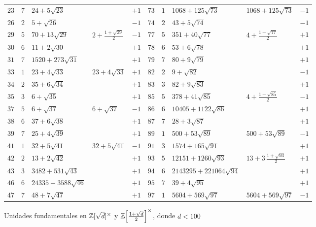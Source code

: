 \begin{figure}
\begin{center}
\begin{tabular}{M{0.3cm}M{0.4cm}M{2.5cm}M{2.1cm}M{0.7cm}|M{0.3cm}M{0.4cm}M{3.3cm}M{2.4cm}M{0.7cm}}
      $23$ & $7$ & $24 + 5\sqrt{23}$ & & $+1$ & $73$ & $1$ & $1068 + 125\sqrt{73}$ & $1068 + 125\sqrt{73}$ & $-1$ \\
      $26$ & $2$ & $5 + \sqrt{26}$ & & $-1$ & $74$ & $2$ & $43 + 5\sqrt{74}$ & & $-1$ \\
      $29$ & $5$ & $70 + 13\sqrt{29}$ & $2 + \frac{1+\sqrt{29}}{2}$ & $-1$ & $77$ & $5$ & $351 + 40\sqrt{77}$ & $4 + \frac{1+\sqrt{77}}{2}$ & $+1$ \\
      $30$ & $6$ & $11 + 2\sqrt{30}$ & & $+1$ & $78$ & $6$ & $53 + 6\sqrt{78}$ & & $+1$ \\
      $31$ & $7$ & $1520 + 273\sqrt{31}$ & & $+1$ & $79$ & $7$ & $80 + 9\sqrt{79}$ & & $+1$ \\
      $33$ & $1$ & $23 + 4\sqrt{33}$ & $23 + 4\sqrt{33}$ & $+1$ & $82$ & $2$ & $9 + \sqrt{82}$ & & $-1$ \\
      $34$ & $2$ & $35 + 6\sqrt{34}$ & & $+1$ & $83$ & $3$ & $82 + 9\sqrt{83}$ & & $+1$ \\
      $35$ & $3$ & $6 + \sqrt{35}$ & & $+1$ & $85$ & $5$ & $378 + 41\sqrt{85}$ & $4 + \frac{1+\sqrt{85}}{2}$ & $-1$ \\
      $37$ & $5$ & $6 + \sqrt{37}$ & $6 + \sqrt{37}$ & $-1$ & $86$ & $6$ & $10405 + 1122\sqrt{86}$ & & $+1$ \\
      $38$ & $6$ & $37 + 6\sqrt{38}$ & & $+1$ & $87$ & $7$ & $28 + 3\sqrt{87}$ & & $+1$ \\
      $39$ & $7$ & $25 + 4\sqrt{39}$ & & $+1$ & $89$ & $1$ & $500 + 53\sqrt{89}$ & $500 + 53\sqrt{89}$ & $-1$ \\
      $41$ & $1$ & $32 + 5\sqrt{41}$ & $32 + 5\sqrt{41}$ & $-1$ & $91$ & $3$ & $1574 + 165\sqrt{91}$ & & $+1$ \\
      $42$ & $2$ & $13 + 2\sqrt{42}$ & & $+1$ & $93$ & $5$ & $12151 + 1260\sqrt{93}$ & $13 + 3\,\frac{1+\sqrt{93}}{2}$ & $+1$ \\
      $43$ & $3$ & $3482 + 531\sqrt{43}$ & & $+1$ & $94$ & $6$ & $2143295 + 221064\sqrt{94}$ & & $+1$ \\
      $46$ & $6$ & $24335 + 3588\sqrt{46}$ & & $+1$ & $95$ & $7$ & $39 + 4\sqrt{95}$ & & $+1$ \\
      $47$ & $7$ & $48 + 7\sqrt{47}$ & & $+1$ & $97$ & $1$ & $5604 + 569\sqrt{97}$ & $5604 + 569\sqrt{97}$ & $-1$ \\
    \end{tabular}
  \end{center}

  \caption{Unidades fundamentales en $\mathbb{Z} [\sqrt{d}]^\times$ y $\mathbb{Z} \Bigl[\frac{1+\sqrt{d}}{2}\Bigr]^\times$, donde $d < 100$}
  \label{fig:unidades-fundamentales-cuadraticas}
\end{figure}

